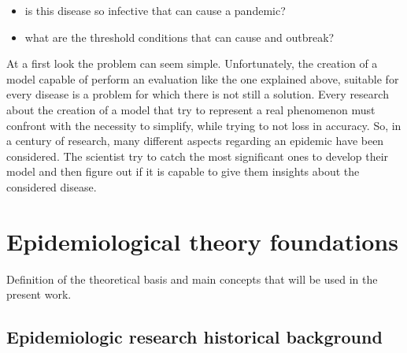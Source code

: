 \begin{itemize}
	\item is this disease so infective that can cause a pandemic?
	\item what are the threshold conditions that can cause and outbreak? 
\end{itemize}


At a first look the problem can seem simple. Unfortunately, the creation of a model capable of perform an evaluation like the one explained above, suitable for every disease is a problem for which there is not still a solution. 
Every research about the creation of a model that try to represent a real phenomenon must confront with the necessity to simplify, while trying to not loss in accuracy. 
So, in a century of research, many different aspects regarding an epidemic have been considered. The scientist try to catch the most significant ones to develop their model and then figure out if it is capable to give them insights about the considered disease. 




\section{Epidemiological theory foundations}

Definition of the theoretical basis and main concepts that will be used in the present work. 
\subsection{ Epidemiologic research historical background}

